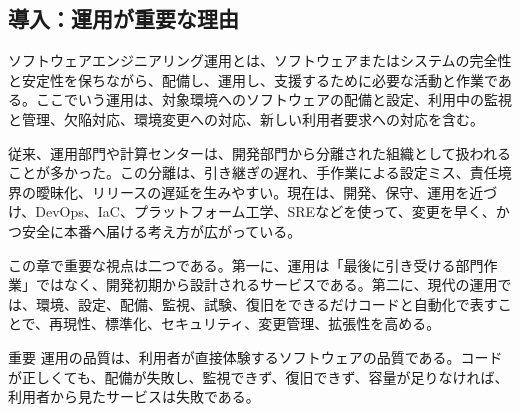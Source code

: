 \subsection*{導入：運用が重要な理由}

ソフトウェアエンジニアリング運用とは、ソフトウェアまたはシステムの完全性と安定性を保ちながら、配備し、運用し、支援するために必要な活動と作業である。ここでいう運用は、対象環境へのソフトウェアの配備と設定、利用中の監視と管理、欠陥対応、環境変更への対応、新しい利用者要求への対応を含む。

従来、運用部門や計算センターは、開発部門から分離された組織として扱われることが多かった。この分離は、引き継ぎの遅れ、手作業による設定ミス、責任境界の曖昧化、リリースの遅延を生みやすい。現在は、開発、保守、運用を近づけ、DevOps、IaC、プラットフォーム工学、SREなどを使って、変更を早く、かつ安全に本番へ届ける考え方が広がっている。

この章で重要な視点は二つである。第一に、運用は「最後に引き受ける部門作業」ではなく、開発初期から設計されるサービスである。第二に、現代の運用では、環境、設定、配備、監視、試験、復旧をできるだけコードと自動化で表すことで、再現性、標準化、セキュリティ、変更管理、拡張性を高める。

\begin{pointbox}{重要}
運用の品質は、利用者が直接体験するソフトウェアの品質である。コードが正しくても、配備が失敗し、監視できず、復旧できず、容量が足りなければ、利用者から見たサービスは失敗である。
\end{pointbox}
